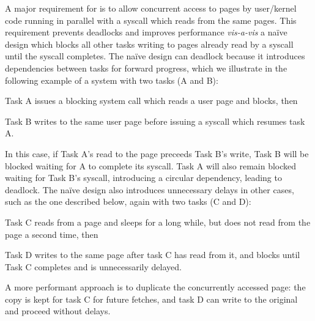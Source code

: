 \documentclass[letterpaper,twocolumn,10pt]{article}
\begin{document}
A major requirement for \midas is to allow concurrent access to pages
by user/kernel code running in parallel with a syscall which reads from
the same pages.
This requirement prevents deadlocks and improves performance \textit{vis-a-vis}
a na\"ive design which blocks all other tasks writing to pages already
read by a syscall until the syscall completes.
The na\"ive design can deadlock because it introduces dependencies between
tasks for forward progress, which we illustrate in the following example
of a system with two tasks (A and B):
\begin{inparaenum}
  \item Task A issues a blocking system call which reads a user page and blocks, then
  \item Task B writes to the same user page before issuing a syscall which
  resumes task A.
\end{inparaenum}
In this case, if Task A's read to the page preceeds Task B's write,
Task B will be blocked waiting for A to complete its syscall.
Task A will also remain blocked waiting for Task B's syscall,
introducing a circular dependency, leading to deadlock.
The na\"ive design also introduces unnecessary delays in other cases,
such as the one described below, again with two tasks (C and D):
\begin{inparaenum}
  \item Task C reads from a page and sleeps for a long while,
        but does not read from the page a second time, then
  \item Task D writes to the same page after task C has read from it,
        and blocks until Task C completes and is unnecessarily delayed.
\end{inparaenum}
A more performant approach is to duplicate the concurrently accessed page:
the copy is kept for task C for future fetches, and task D
can write to the original and proceed without delays.
\end{document}
